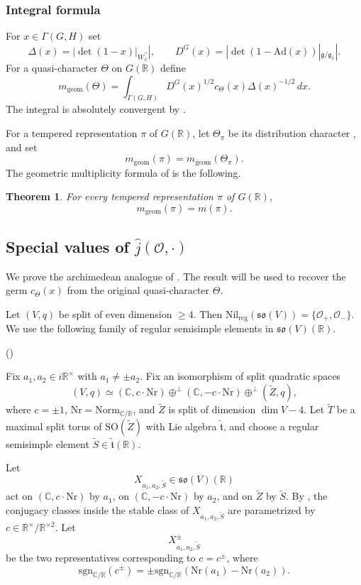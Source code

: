 \documentclass[12pt]{amsart}
\numberwithin{equation}{subsection}
\newcounter{keepeqno}
\newenvironment{num}
 {\setcounter{keepeqno}{\value{equation}}%
  \begin{list}{(\theequation)}{\usecounter{equation}}%
  \setcounter{equation}{\value{keepeqno}}}
 {\end{list}}
\newcommand{\BC}{{\mathbb {C}}}
\newcommand{\BR}{{\mathbb {R}}}
\newcommand{\CO}{{\mathcal {O}}}
\newcommand{\Fg}{{\mathfrak {g}}}
\newcommand{\Fo}{{\mathfrak {o}}}
\newcommand{\Fs}{{\mathfrak {s}}}
\newcommand{\Ft}{{\mathfrak {t}}}
\newcommand{\Ad}{{\mathrm{Ad}}}
\newcommand{\reg}{{\mathrm{reg}}}
\newcommand{\SO}{{\mathrm{SO}}}
\newcommand{\sgn}{{\mathrm{sgn}}}
\def\Del{{\Delta}}
\def\nil{\mathrm{Nil}}
\def\Nr{\mathrm{Nr}}
\def\Gam{{\Gamma}}
\def\p{\prime}
\def\geom{\mathrm{geom}}
\def\SO{\mathrm{SO}}
\def\Norm{\mathrm{Norm}}
\newtheorem{thm}{Theorem}[subsection]
\begin{document}
\subsubsection{Integral formula}

For $x\in \Gam(G,H)$ set
\[
\Del(x)=|\det(1-x)|_{W^{\p\p}_x}|,
\qquad
D^G(x)=|\det(1-\Ad(x))|_{\Fg/\Fg_x}|.
\]
For a quasi-character $\Theta$ on $G(\BR)$ define
\begin{equation}\label{eq:geomultiplicity}
m_\geom(\Theta)
=
\int_{\Gam(G,H)}
D^G(x)^{1/2}c_\Theta(x)\Del(x)^{-1/2}\,dx .
\end{equation}
The integral is absolutely convergent by
\cite[Prop.~7.3.3.3]{thesis_zhilin}.

For a tempered representation $\pi$ of $G(\BR)$, let $\Theta_\pi$ be its
distribution character \cite{MR145006}, and set
\[
m_\geom(\pi)=m_\geom(\Theta_\pi).
\]
The geometric multiplicity formula of \cite{thesis_zhilin} is the following.

\begin{thm}\label{thm:luothesis}
For every tempered representation $\pi$ of $G(\BR)$,
\[
m_\geom(\pi)=m(\pi).
\]
\end{thm}

\subsection{\texorpdfstring{Special values of $\widehat{j}(\CO,\cdot)$}{Special values of j-hat}}
\label{subsec:specialvalueregularnilporbitalintegral}

We prove the archimedean analogue of \cite[Lem.~13.4~(ii)]{waldspurger10}.
The result will be used to recover the germ $c_\Theta(x)$ from the original
quasi-character $\Theta$.

Let $(V,q)$ be split of even dimension $\geq 4$. Then
$\nil_\reg(\Fs\Fo(V))=\{\CO_+,\CO_-\}$. We use the following family of regular
semisimple elements in $\Fs\Fo(V)(\BR)$.

\begin{num}
\item\label{num:specialvalue:1}
Fix $a_1,a_2\in i\BR^\times$ with $a_1\neq \pm a_2$. Fix an isomorphism of
split quadratic spaces
\[
(V,q)
\simeq
(\BC,c\cdot \Nr)\oplus^\perp(\BC,-c\cdot \Nr)\oplus^\perp(\widetilde Z,q),
\]
where $c=\pm 1$, $\Nr=\Norm_{\BC/\BR}$, and $\widetilde Z$ is split of
dimension $\dim V-4$. Let $\widetilde T$ be a maximal split torus of
$\SO(\widetilde Z)$ with Lie algebra $\widetilde{\Ft}$, and choose a regular
semisimple element $\widetilde S\in \widetilde{\Ft}(\BR)$.

Let
\[
X_{a_1,a_2,\widetilde S}\in \Fs\Fo(V)(\BR)
\]
act on $(\BC,c\cdot \Nr)$ by $a_1$, on $(\BC,-c\cdot \Nr)$ by $a_2$, and on
$\widetilde Z$ by $\widetilde S$. By
\cite[Lem.~5.1.0.5]{thesis_zhilin}, the conjugacy classes inside the stable
class of $X_{a_1,a_2,\widetilde S}$ are parametrized by
$c\in \BR^\times/\BR^{\times 2}$. Let
\[
X^\pm_{a_1,a_2,\widetilde S}
\]
be the two representatives corresponding to $c=c^\pm$, where
\[
\sgn_{\BC/\BR}(c^\pm)
=
\pm \sgn_{\BC/\BR}(\Nr(a_1)-\Nr(a_2)).
\]
\end{num}
\end{document}
